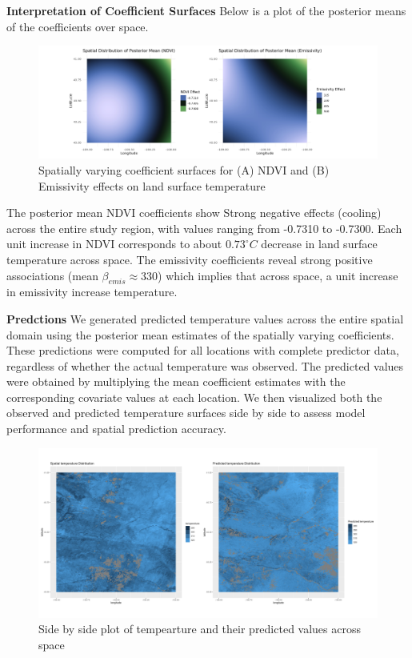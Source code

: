 \textbf{Interpretation of Coefficient Surfaces} \newline
Below is a plot of the posterior means of the coefficients over space.

\begin{figure}[h]
 \centering
 \includegraphics[width=\textwidth]{../../figures/model_means.png}
 \caption{Spatially varying coefficient surfaces for (A) NDVI and (B) Emissivity effects on land surface temperature}
 \label{fig:posterior means}
 \end{figure}
 The posterior mean NDVI coefficients show Strong negative effects (cooling) across the entire study region, with values ranging from -0.7310 to -0.7300. 
 Each unit increase in NDVI corresponds to about $0.73^\circ C$ decrease in land surface temperature across space.
 The emissivity coefficients reveal strong positive associations (mean $\beta_{emis} \approx 330$) which implies that across space, a unit increase in emissivity increase temperature.\newline
 
 
 \textbf{Predctions} \newline
 We generated predicted temperature values across the entire spatial domain using the posterior mean estimates of the spatially varying coefficients. 
 These predictions were computed for all locations with complete predictor data, regardless of whether the actual temperature was observed. 
 The predicted values were obtained by multiplying the mean coefficient estimates with the corresponding covariate values at each location. 
 We then visualized both the observed and predicted temperature surfaces side by side to assess model performance and spatial prediction accuracy. 
 
 
 \begin{figure}[h]
 \centering
 \includegraphics[width=\textwidth]{../../figures/predictions.png}
 \caption{Side by side plot of tempearture and their predicted values across space}
 \label{fig:predicted temperature}
 \end{figure}
 
